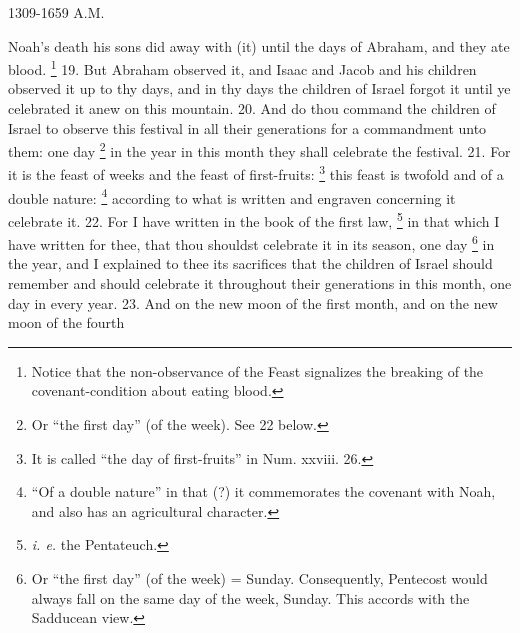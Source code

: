 1309-1659 A.M.

Noah's death his sons did away with (it) until the days of Abraham, and they ate blood. \footnote{Notice that the non-observance of the Feast signalizes the breaking of the covenant-condition about eating blood.} 19. But Abraham observed it, and Isaac and Jacob and his children observed it up to thy days, and in thy days the children of Israel forgot it until ye celebrated it anew on this mountain. 20. And do thou command the children of Israel to observe this festival in all their generations for a commandment unto them: one day \footnote{Or ``the first day'' (of the week). See 22 below.} in the year in this month they shall celebrate the festival. 21. For it is the feast of weeks and the feast of first-fruits: \footnote{It is called ``the day of first-fruits'' in Num. xxviii. 26.} this feast is twofold and of a double nature: \footnote{``Of a double nature'' in that (?) it commemorates the covenant with Noah, and also has an agricultural character.} according to what is written and engraven concerning it celebrate it. 22. For I have written in the book of the first law, \footnote{\emph{i. e.} the Pentateuch.} in that which I have written for thee, that thou shouldst celebrate it in its season, one day \footnote{Or ``the first day'' (of the week) = Sunday. Consequently, Pentecost would always fall on the same day of the week, Sunday. This accords with the Sadducean view.} in the year, and I explained to thee its sacrifices that the children of Israel should remember and should celebrate it throughout their generations in this month, one day in every year. 23. And on the new moon of the first month, and on the new moon of the fourth

